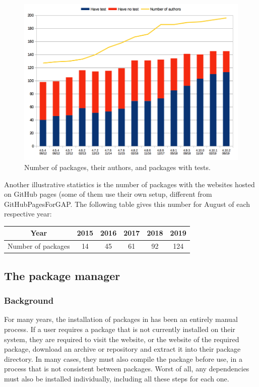 \begin{figure}[!ht]
    \centering
    \includegraphics[width=\textwidth]{images/gap-package-tests}
    \caption{Number of \GAP packages, their authors, and packages with tests.}
    \label{fig:gap-package-tests}
\end{figure}

Another illustrative statistics is the number of \GAP packages
with the websites hosted on GitHub pages (some of them use
their own setup, different from {\sf GitHubPagesForGAP}.
The following table gives this number for August of each respective year:

\begin{center}
\begin{tabular}{| c | c | c | c | c | c |} 
\hline
Year & 2015 & 2016 & 2017 & 2018 & 2019 \\
\hline
Number of packages & 14 & 45 & 61 & 92 & 124 \\
\hline
\end{tabular}
\end{center}

\subsection{The \GAP package manager}\label{pkg-manager}

\subsubsection{Background}

For many years, the installation of packages in \GAP has been an entirely manual
process.  If a user requires a package that is not currently installed on their
system, they are required to visit the \GAP website, or the website of the
required package, download an archive or repository and extract it into their
package directory.  In many cases, they must also compile the package before
use, in a process that is not consistent between packages.  Worst of all, any
dependencies must also be installed individually, including all these steps for
each one.

